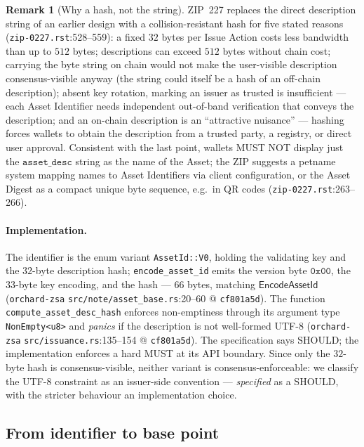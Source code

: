 \documentclass[11pt,a4paper]{article}
\theoremstyle{definition}
\newtheorem{remark}[theorem]{Remark}
\begin{document}
\begin{remark}[Why a hash, not the string]\label{rem:zsa-desc-hash}
ZIP~227 replaces the direct description string of an earlier design with a
collision-resistant hash for five stated reasons
(\texttt{zip-0227.rst}:528--559): a fixed $32$ bytes per Issue Action costs
less bandwidth than up to $512$ bytes; descriptions can exceed $512$ bytes
without chain cost; carrying the byte string on chain would not make the
user-visible description consensus-visible anyway (the string could itself
be a hash of an off-chain description); absent key rotation, marking an
issuer as trusted is insufficient --- each Asset Identifier needs
independent out-of-band verification that conveys the description; and an
on-chain description is an ``attractive nuisance'' --- hashing forces
wallets to obtain the description from a trusted party, a registry, or
direct user approval. Consistent with the last point, wallets MUST NOT
display just the $\texttt{asset\_desc}$ string as the name of the Asset;
the ZIP suggests a petname system mapping names to Asset Identifiers via
client configuration, or the Asset Digest as a compact unique byte
sequence, e.g.\ in QR codes (\texttt{zip-0227.rst}:263--266).
\end{remark}

\paragraph{Implementation.} The identifier is the enum variant
\texttt{AssetId::V0}, holding the validating key and the $32$-byte
description hash; \texttt{encode\_asset\_id} emits the version byte
$\mathtt{0x00}$, the $33$-byte key encoding, and the hash --- $66$ bytes,
matching $\mathsf{EncodeAssetId}$ (\texttt{orchard-zsa}
\texttt{src/note/asset\_base.rs}:20--60 @ \texttt{cf801a5d}). The function
\texttt{compute\_asset\_desc\_hash} enforces non-emptiness through its
argument type \texttt{NonEmpty<u8>} and \emph{panics} if the description
is not well-formed UTF-8 (\texttt{orchard-zsa}
\texttt{src/issuance.rs}:135--154 @ \texttt{cf801a5d}). The specification
says SHOULD; the implementation enforces a hard MUST at its API boundary.
Since only the $32$-byte hash is consensus-visible, neither variant is
consensus-enforceable: we classify the UTF-8 constraint as an issuer-side
convention --- \emph{specified} as a SHOULD, with the stricter behaviour
an implementation choice.

\subsection{From identifier to base point}\label{sec:zsa-asset-base}
\end{document}
